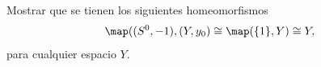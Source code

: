 \begin{ejercicio}
    Mostrar que se tienen los siguientes homeomorfismos
    \begin{equation*}
        \map((S^0,-1),(Y,y_0)\cong \map(\{1\},Y)\cong Y,
    \end{equation*}
    para cualquier espacio $Y$.
\end{ejercicio}

\begin{demostracion}

\end{demostracion}
